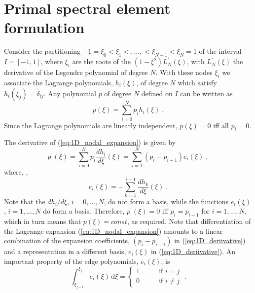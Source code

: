 \documentclass[graybox]{svmult}
\begin{document}
\section{Primal spectral element formulation}
\label{sec:primal_formulation}
Consider the partitioning $-1=\xi_0<\xi_1 <,\ldots,<\xi_{N-1}<\xi_N=1$ of the interval $I=[-1,1]$, where $\xi_i$ are the roots of the $(1-\xi^2)L_N^{\prime}(\xi)$, with $L_N^{\prime}(\xi)$ the derivative of the Legendre polynomial of degree $N$. With these nodes $\xi_i$ we associate the Lagrange polynomials, $h_i(\xi)$, of degree $N$ which satisfy $h_i(\xi_j)=\delta_{ij}$. Any polynomial $p$ of degree $N$ defined on $I$ can be written as
\begin{equation}
p(\xi) = \sum_{i=0}^N p_i h_i(\xi) \;.
\label{eq:1D_nodal_expansion}
\end{equation}
Since the Lagrange polynomials are linearly independent, $p(\xi)=0$ iff all $p_i=0$.

The derivative of (\ref{eq:1D_nodal_expansion}) is given by
\begin{equation}
p^{\prime}(\xi) = \sum_{i=0}^N p_i \frac{dh_i}{d\xi} (\xi) = \sum_{i=1}^N \left ( p_i - p_{i-1} \right ) e_i(\xi) \;,
\label{eq:1D_deriivative}
\end{equation}
where, \cite{Gerritsma},
\[ e_i(\xi) = - \sum_{k=1}^{i-1} \frac{dh_k}{d\xi}(\xi) \;. \]
Note that the $dh_i/d\xi$, $i=0,\ldots,N$, do not form a basis, while the functions $e_i(\xi)$, $i=1,\ldots,N$ do form a basis. Therefore, $p^{\prime}(\xi) =0$ iff $p_i=p_{i-1}$ for $i=1,\ldots,N$, which in turn means that $p(\xi)=const$, as required. Note that differentiation of the Lagrange expansion (\ref{eq:1D_nodal_expansion}) amounts to a linear combination of the expansion coefficients, $(p_i-p_{i-1})$ in (\ref{eq:1D_deriivative}) and a representation in a different basis, $e_i(\xi)$ in (\ref{eq:1D_deriivative}). An important property of the edge polynomials, $e_i(\xi)$, is
\begin{equation}
\int_{\xi_{j-1}}^{\xi_j} e_i(\xi)\,\mathrm{d}\xi = \left \{ \begin{array}{ll}
1 \quad \quad & \mbox{if } i=j \\[1ex]
0 \quad \quad & \mbox{if } i\neq j
\end{array} \right . \;.
\label{eq:integral_property_edge}
\end{equation}
\end{document}
